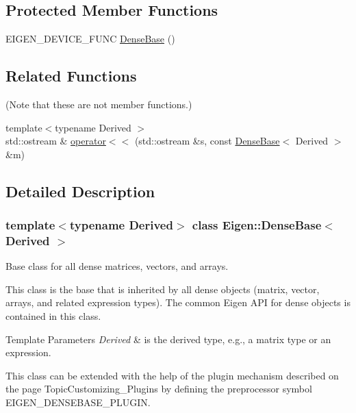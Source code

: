 \subsection*{Protected Member Functions}
\begin{DoxyCompactItemize}
\item 
E\+I\+G\+E\+N\+\_\+\+D\+E\+V\+I\+C\+E\+\_\+\+F\+U\+NC \mbox{\hyperlink{class_eigen_1_1_dense_base_ae966dfaa11cfd07e87da040b7a9d8216}{Dense\+Base}} ()
\end{DoxyCompactItemize}
\subsection*{Related Functions}
(Note that these are not member functions.) \begin{DoxyCompactItemize}
\item 
{\footnotesize template$<$typename Derived $>$ }\\std\+::ostream \& \mbox{\hyperlink{class_eigen_1_1_dense_base_a3806d3f42de165878dace160e6aba40a}{operator$<$$<$}} (std\+::ostream \&s, const \mbox{\hyperlink{class_eigen_1_1_dense_base}{Dense\+Base}}$<$ Derived $>$ \&m)
\end{DoxyCompactItemize}


\subsection{Detailed Description}
\subsubsection*{template$<$typename Derived$>$\newline
class Eigen\+::\+Dense\+Base$<$ Derived $>$}

Base class for all dense matrices, vectors, and arrays. 

This class is the base that is inherited by all dense objects (matrix, vector, arrays, and related expression types). The common Eigen A\+PI for dense objects is contained in this class.


\begin{DoxyTemplParams}{Template Parameters}
{\em Derived} & is the derived type, e.\+g., a matrix type or an expression.\\
\hline
\end{DoxyTemplParams}
This class can be extended with the help of the plugin mechanism described on the page Topic\+Customizing\+\_\+\+Plugins by defining the preprocessor symbol {\ttfamily E\+I\+G\+E\+N\+\_\+\+D\+E\+N\+S\+E\+B\+A\+S\+E\+\_\+\+P\+L\+U\+G\+IN}.

